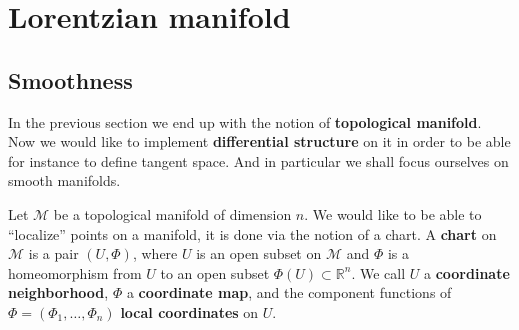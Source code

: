 \documentclass[10pt]{book}
\newcommand{\Mcal}{\mathcal{M}}
\newcommand{\Rbb}{\mathbb{R}}
\theoremstyle{break}
\begin{document}
\section{Lorentzian manifold}


\subsection{Smoothness}


In the previous section we end up with the notion of \textbf{topological manifold}. Now we would like to implement \textbf{differential structure} on it in order to be able for instance to define tangent space. And in particular we shall focus ourselves on smooth manifolds.


\bigskip


Let $\Mcal$ be a topological manifold of dimension $n$. We would like to be able to ``localize'' points on a manifold, it is done via the notion of a chart. A \textbf{chart} on $\Mcal$ is a pair $(U,\Phi)$, where $U$ is an open subset on $\Mcal$ and $\Phi$ is a homeomorphism from $U$ to an open subset $\Phi(U) \subset \Rbb^n$. We call $U$ a \textbf{coordinate neighborhood}, $\Phi$ a \textbf{coordinate map}, and the component functions of $\Phi=(\Phi_1,\dots,\Phi_n)$ \textbf{local coordinates} on $U$.
\end{document}
